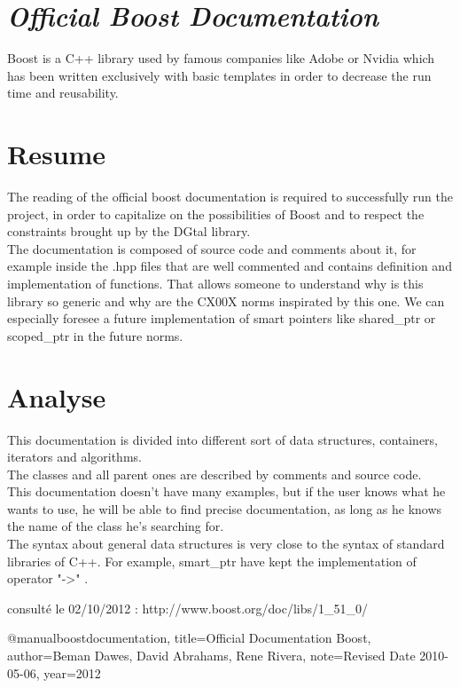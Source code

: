 \documentclass[a4paper,11pt]{report}
\begin{document}
\section{\emph{Official Boost Documentation}}



Boost is a C++ library used by famous companies like Adobe or Nvidia which has been written exclusively with basic templates in order to decrease  the run time and reusability.

\section{Resume}

The reading of the official boost documentation is required to successfully run the project, in order to capitalize on the possibilities of Boost and to respect the constraints brought up by the DGtal library. \\
The documentation is composed of source code and comments about it, for example inside the .hpp files that are well commented and contains definition and implementation of functions.
That allows someone to understand why is this library so generic and why are the CX00X norms inspirated by this one. 
We can especially foresee a future implementation of smart pointers like shared\_ptr or scoped\_ptr in the future norms. 


\section{Analyse}

This documentation is divided into different sort of data structures, containers, iterators and algorithms. \\
The classes and all parent ones are described by comments and source code. \\
This documentation doesn't have many examples, but  if the user knows what he wants to use, he will be able to find precise documentation, as long as he knows the name of the class he's searching for. \\
The syntax about general data structures is very close to the syntax of standard libraries of C++. For example, smart\_ptr have kept the implementation of operator "->" .

consulté le 02/10/2012 : http://www.boost.org/doc/libs/1\_51\_0/

@manual{boostdocumentation,
title={Official Documentation  Boost},
author={Beman Dawes, David Abrahams, Rene Rivera},
note={Revised Date 2010-05-06},
year={2012}
}
\end{document}
